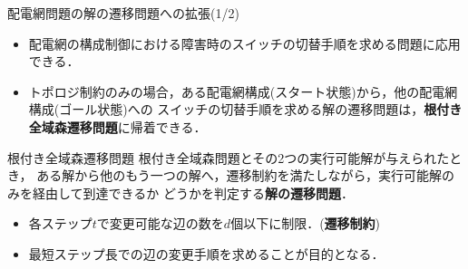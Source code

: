 \begin{frame}{配電網問題の解の遷移問題への拡張(1/2)}
 \begin{itemize}
  \item 配電網の構成制御における障害時のスイッチの切替手順を求める問題に応用できる．
  \item トポロジ制約のみの場合，ある配電網構成(スタート状態)から，他の配電網構成(ゴール状態)への
        スイッチの切替手順を求める解の遷移問題は，\alert{\bf 根付き全域森遷移問題}に帰着できる．
 \end{itemize}
 \begin{block}{根付き全域森遷移問題}
  根付き全域森問題とその2つの実行可能解が与えられたとき，
  ある解から他のもう一つの解へ，遷移制約を満たしながら，実行可能解のみを経由して到達できるか
  どうかを判定する\alert{\bf 解の遷移問題}．
  \begin{itemize}
  \item 各ステップ$t$で変更可能な辺の数を$d$個以下に制限．(\textbf{遷移制約})
  \item 最短ステップ長での辺の変更手順を求めることが目的となる．
  \end{itemize}
 \end{block} 
\end{frame}
